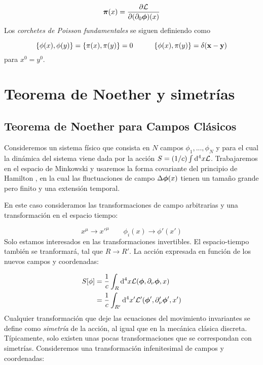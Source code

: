 \begin{equation}
	\boldsymbol{\pi} (x) = \frac{\partial \mathcal{L}}{\partial (\partial_0 \boldsymbol{\phi})(x)}
\end{equation}
Los \textit{corchetes de Poisson fundamentales} se siguen definiendo como

\begin{equation} 
	\{ \phi(x),\phi(y) \} = 
	\{ \pi(x),\pi(y) \} = 0 \quad \quad \quad 
	\{ \phi(x),\pi(y) \}  = \delta(\mathbf{x}-\mathbf{y})
\end{equation}
para $x^0 = y^0$. 



\section{Teorema de Noether y simetrías}
\subsection{Teorema de Noether para Campos Clásicos}

Consideremos un sistema físico que consista en $N$ campos $\phi_1,...,\phi_N$ y para el cual la dinámica del sistema viene dada por la acción $S=(1/c) \int \mathrm{d}^4 x \mathcal{L}$. Trabajaremos en el espacio de Minkowski y usaremos la forma covariante del principio de Hamilton , en la cual las fluctuaciones de campo $\Delta \boldsymbol{\phi} (x)$ tienen un tamaño grande pero finito y una extensión temporal. 

En este caso consideramos las transformaciones de campo arbitrarias y una transformación en el espacio tiempo:

\begin{equation}
	x^\mu  \rightarrow x'^\mu \qquad \phi_i(x) \rightarrow \phi'(x')
\end{equation}
Solo estamos interesados en las transformaciones invertibles. El espacio-tiempo también se tranformará, tal que $R\rightarrow R'$. La acción expresada en función de los nuevos campos y coordenadas:

\begin{equation}
	\begin{split}
	S[\phi]& = \frac{1}{c} \int_{R} \mathrm{d}^4 x \mathcal{L}(\boldsymbol{\phi},\partial_\nu\boldsymbol{\phi},x)  \\
	& = \frac{1}{c} \int_{R'} \mathrm{d}^4 x' \mathcal{L}'(\boldsymbol{\phi}',\partial_\nu'\boldsymbol{\phi}',x')
	 \end{split} \label{Ec:02-02-02}
\end{equation}
Cualquier transformación que deje las ecuaciones del movimiento invariantes se define como \textit{simetría} de la acción, al igual que en la mecánica clásica discreta. Típicamente, solo existen unas pocas transformaciones que se correspondan con simetrías. Consideremos una transformación infenitesimal de campos y coordenadas:


